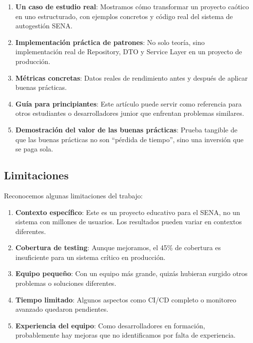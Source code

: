 \begin{enumerate}
    \item \textbf{Un caso de estudio real}: Mostramos cómo transformar un proyecto caótico en uno estructurado, con ejemplos concretos y código real del sistema de autogestión SENA.
    
    \item \textbf{Implementación práctica de patrones}: No solo teoría, sino implementación real de Repository, DTO y Service Layer en un proyecto de producción.
    
    \item \textbf{Métricas concretas}: Datos reales de rendimiento antes y después de aplicar buenas prácticas.
    
    \item \textbf{Guía para principiantes}: Este artículo puede servir como referencia para otros estudiantes o desarrolladores junior que enfrentan problemas similares.
    
    \item \textbf{Demostración del valor de las buenas prácticas}: Prueba tangible de que las buenas prácticas no son ``pérdida de tiempo'', sino una inversión que se paga sola.
\end{enumerate}

\subsection{Limitaciones}

Reconocemos algunas limitaciones del trabajo:

\begin{enumerate}
    \item \textbf{Contexto específico}: Este es un proyecto educativo para el SENA, no un sistema con millones de usuarios. Los resultados pueden variar en contextos diferentes.
    
    \item \textbf{Cobertura de testing}: Aunque mejoramos, el 45\% de cobertura es insuficiente para un sistema crítico en producción.
    
    \item \textbf{Equipo pequeño}: Con un equipo más grande, quizás hubieran surgido otros problemas o soluciones diferentes.
    
    \item \textbf{Tiempo limitado}: Algunos aspectos como CI/CD completo o monitoreo avanzado quedaron pendientes.
    
    \item \textbf{Experiencia del equipo}: Como desarrolladores en formación, probablemente hay mejoras que no identificamos por falta de experiencia.
\end{enumerate}

